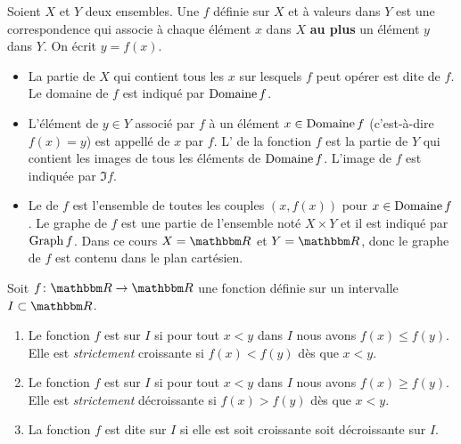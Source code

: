 \begin{definition}
  Soient $X$ et $Y$ deux ensembles. Une  $f$ définie sur $X$ et à valeurs dans $Y$ est une correspondence qui associe à chaque élément $x$ dans $X$ {\bf au plus} un élément $y$ dans $Y$. On écrit $y= f(x)$.
  \begin{itemize}
  \item La partie de $X$ qui contient tous les $x$ sur lesquels $f$ peut opérer est dite  de $f$. Le domaine de $f$ est indiqué par $\operatorname{Domaine} f$.
  \item L'élément de $y\in Y$ associé par $f$ à un élément $x\in \operatorname{Domaine} f$ (c'est-à-dire $f(x) = y$)  est appellé  de $x$ par $f$. L' de la fonction $f$ est la partie de $Y$ qui contient les images de tous les éléments de $\operatorname{Domaine} f$. L'image de $f$ est indiquée par $\Im f$.
  \item Le  de $f$ est l'ensemble de toutes les couples $(x, f(x))$ pour $x\in \operatorname{Domaine} f$. Le graphe de $f$ est une partie de l'ensemble noté $X\times Y$ et il est indiqué par $\operatorname{Graph} f$. Dans ce cours $X = \eR$ et $Y = \eR$, donc le graphe de $f$ est contenu dans le plan cartésien.
  \end{itemize}
\end{definition}

\begin{definition}
    Soit \( f\colon \eR\to \eR\) une fonction définie sur un intervalle \( I\subset \eR\).
    \begin{enumerate}
        \item
            Le fonction \( f\) est  sur \( I\) si pour tout \( x<y\) dans \( I\) nous avons \( f(x)\leq f(y)\). Elle est \emph{strictement} croissante si \( f(x)<f(y)\) dès que \( x<y\).
        \item
            Le fonction \( f\) est  sur \( I\) si pour tout \( x<y\) dans \( I\) nous avons \( f(x)\geq f(y)\). Elle est \emph{strictement} décroissante si \( f(x)>f(y)\) dès que \( x<y\).
        \item
            La fonction \( f\) est dite  sur \( I\) si elle est soit croissante soit décroissante sur \( I\).
    \end{enumerate}
\end{definition}

